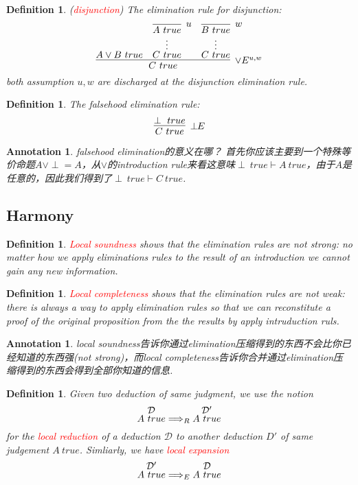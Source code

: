\documentclass{article}
\theoremstyle{plain}
\newtheorem{definition}[theorem]{Definition}
\newtheorem{annotation}[theorem]{Annotation}
\theoremstyle{nonumberplain}
\newcommand{\redt}[1]{\textcolor{red}{#1}}
\begin{document}
\begin{definition}
\rm (\redt{disjunction}) The elimination rule for disjunction:
$$
\infer[\vee E^{u,w}]{C~true}{A \vee B ~true & \deduce[\vdots]{C~true}{\infer[u]{A~true}{}} & \deduce[\vdots]{C~true}{\infer[w]{B~true}{}}}
$$
both assumption $u,w$ are discharged at the disjunction elimination rule. 
\end{definition}


\begin{definition}
\rm The falsehood elimination rule:
$$
\infer[\perp\!\!E]{C~true}{\perp~true}
$$
\end{definition}

\begin{annotation}
\rm falsehood elimination的意义在哪？ 首先你应该主要到一个特殊等价命题$A \vee \perp = A$，从$\vee$的introduction rule来看这意味$\perp~true \vdash A~true$，由于$A$是任意的，因此我们得到了$\perp~true \vdash C~true$. 
\end{annotation}

\newpage
\subsection{Harmony}

\begin{definition}
\rm \redt{Local soundness} shows that the elimination rules are not strong: no matter how we apply eliminations rules to the result of an introduction we cannot gain any new information.
\end{definition}

\begin{definition}
\rm \redt{Local completeness} shows that the elimination rules are not weak: there is always a way to apply elimination rules so that we can reconstitute a proof of the original proposition from the the results by apply intruduction ruls. 
\end{definition}

\begin{annotation}
\rm local soundness告诉你通过elimination压缩得到的东西不会比你已经知道的东西强(not strong)，而local completeness告诉你合并通过elimination压缩得到的东西会得到全部你知道的信息. 
\end{annotation}


\begin{definition}
\rm Given two deduction of same judgment, we use the notion
$$
\deduce{A~true}{\mathcal{D}} \Longrightarrow_{R} \deduce{A~true}{\mathcal{D'}} 
$$
for the \redt{local reduction} of a deduction $\mathcal{D}$ to another deduction $D'$ of same judgement $A~true$. Simliarly, we have \redt{local expansion}
$$
\deduce{A~true}{\mathcal{D}'} \Longrightarrow_{E} \deduce{A~true}{\mathcal{D}}
$$
\end{definition}
\end{document}
